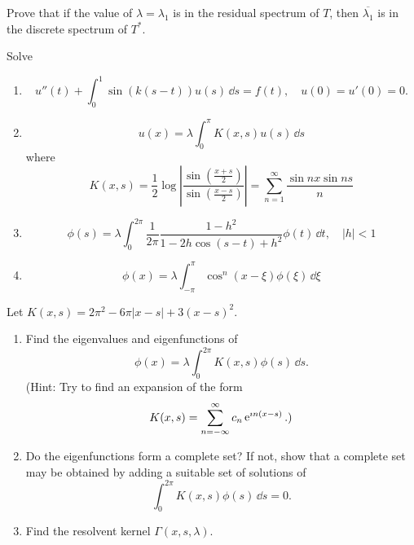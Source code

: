 \begin{Exercise}
  Prove that if the value of $\lambda = \lambda_1$ is in the residual spectrum
  of $T$, then $\overline{\lambda_1}$ is in the discrete spectrum of $T^*$.
\end{Exercise}



\begin{Exercise}
  Solve
  \begin{enumerate}
  \item
    \[
    u''(t) + \int_0^1 \sin(k(s-t)) u(s) \,\dd s = f(t), \quad
    u(0) = u'(0) = 0.
    \]
  \item
    \[
    u(x) = \lambda \int_0^\pi K(x,s) u(s) \,\dd s
    \]
    where
    \[
    K(x,s) = \frac{1}{2} \log \left| \frac{ \sin \left( \frac{x+s}{2} \right) }
      { \sin \left( \frac{x-s}{2} \right) } \right|
    = \sum_{n = 1}^\infty \frac{ \sin n x \sin n s }{ n }
    \]
  \item
    \[
    \phi(s) = \lambda \int_0^{2 \pi} \frac{1}{2 \pi} \frac{ 1 - h^2 }
    { 1 - 2 h \cos (s - t) + h^2 } \phi(t) \,\dd t, \quad
    |h| < 1
    \]
  \item
    \[
    \phi(x) = \lambda \int_{-\pi}^\pi \cos^n (x - \xi) \phi(\xi) \,\dd \xi
    \]
  \end{enumerate}
\end{Exercise}



\begin{Exercise}
  Let $K(x,s) = 2 \pi^2 - 6 \pi |x-s| + 3 (x-s)^2$.
  \begin{enumerate}
  \item
    Find the eigenvalues and eigenfunctions of 
    \[
    \phi(x) = \lambda \int_0^{2 \pi} K(x,s) \phi(s) \,\dd s.
    \]
    (Hint: Try to find an expansion of the form
    \[
    K(x,s) = \sum_{n = -\infty}^\infty c_n \mathop{\mathrm{e}}\nolimits^{\imath n (x-s)}.)
    \]
  \item
    Do the eigenfunctions form a complete set?  If not, show that a complete set
    may be obtained by adding a suitable set of solutions of 
    \[
    \int_0^{2\pi} K(x,s) \phi(s) \,\dd s = 0.
    \]
  \item
    Find the resolvent kernel $\Gamma(x,s,\lambda)$.
  \end{enumerate}
\end{Exercise}



